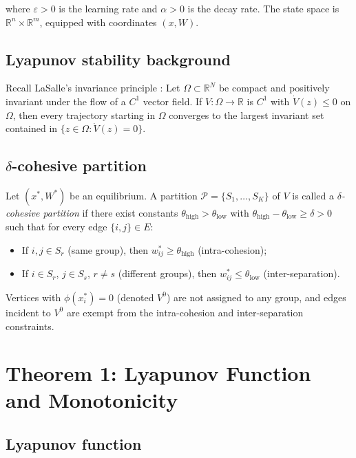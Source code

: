 \documentclass[3p]{elsarticle}
\newcommand{\R}{\mathbb{R}}
\newcommand{\eps}{\varepsilon}
\begin{document}
where $\eps>0$ is the learning rate and $\alpha>0$ is the decay rate. The state space is $\R^n\times\R^m$, equipped with coordinates $(x,W)$.

\subsection{Lyapunov stability background}

Recall LaSalle's invariance principle \cite{lasalle1960some,khalil2002nonlinear}: Let $\Omega\subset\R^N$ be compact and positively invariant under the flow of a $C^1$ vector field. If $V:\Omega\to\R$ is $C^1$ with $\dot V(z)\le 0$ on $\Omega$, then every trajectory starting in $\Omega$ converges to the largest invariant set contained in $\{z\in\Omega:\dot V(z)=0\}$.

\subsection{$\delta$-cohesive partition} \label{sec:cohesive-def}

Let $(x^*,W^*)$ be an equilibrium. A partition $\mathcal{P}=\{S_1,\dots,S_K\}$ of $V$ is called a \emph{$\delta$-cohesive partition} if there exist constants $\theta_{\text{high}} > \theta_{\text{low}}$ with $\theta_{\text{high}} - \theta_{\text{low}} \ge \delta > 0$ such that for every edge $\{i,j\}\in E$:
\begin{itemize}
  \item If $i,j\in S_r$ (same group), then $w_{ij}^* \ge \theta_{\text{high}}$ (intra-cohesion);
  \item If $i\in S_r$, $j\in S_s$, $r\neq s$ (different groups), then $w_{ij}^* \le \theta_{\text{low}}$ (inter-separation).
\end{itemize}
Vertices with $\phi(x_i^*)=0$ (denoted $V^0$) are not assigned to any group, and edges incident to $V^0$ are exempt from the intra-cohesion and inter-separation constraints.

\section{Theorem 1: Lyapunov Function and Monotonicity}

\subsection{Lyapunov function}
\end{document}
